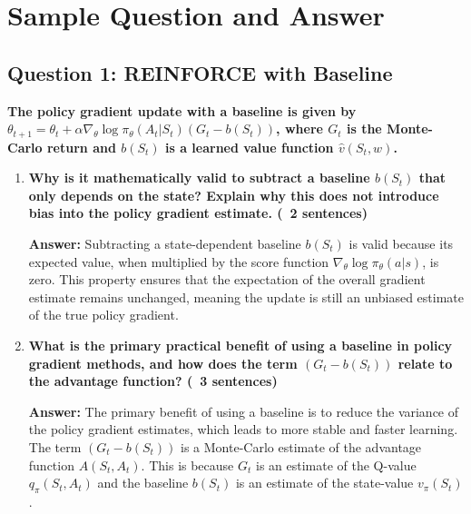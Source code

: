 \documentclass[12pt]{article}
\begin{document}
\section{Sample Question and Answer}

\subsection{Question 1: REINFORCE with Baseline}
\textbf{The policy gradient update with a baseline is given by $\theta_{t+1} = \theta_t + \alpha \nabla_\theta \log \pi_\theta(A_t|S_t) (G_t - b(S_t))$, where $G_t$ is the Monte-Carlo return and $b(S_t)$ is a learned value function $\hat{v}(S_t, w)$.}
\begin{enumerate}
    \item \textbf{Why is it mathematically valid to subtract a baseline $b(S_t)$ that only depends on the state? Explain why this does not introduce bias into the policy gradient estimate. (~2 sentences)}

    \textbf{Answer:} Subtracting a state-dependent baseline $b(S_t)$ is valid because its expected value, when multiplied by the score function $\nabla_\theta \log \pi_\theta(a|s)$, is zero. This property ensures that the expectation of the overall gradient estimate remains unchanged, meaning the update is still an unbiased estimate of the true policy gradient.
    \item \textbf{What is the primary practical benefit of using a baseline in policy gradient methods, and how does the term $(G_t - b(S_t))$ relate to the advantage function? (~3 sentences)}

    \textbf{Answer:} The primary benefit of using a baseline is to reduce the variance of the policy gradient estimates, which leads to more stable and faster learning. The term $(G_t - b(S_t))$ is a Monte-Carlo estimate of the advantage function $A(S_t, A_t)$. This is because $G_t$ is an estimate of the Q-value $q_\pi(S_t, A_t)$ and the baseline $b(S_t)$ is an estimate of the state-value $v_\pi(S_t)$.
\end{enumerate}
\end{document}
